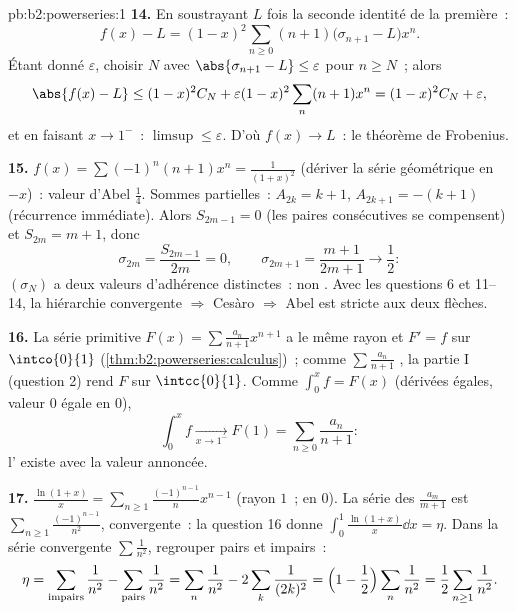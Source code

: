 \begin{solution}{pb:b2:powerseries:1}
\textbf{14.} En soustrayant $L$ fois la seconde identité de la
première~:
\[
f(x) - L = (1-x)^2\sum_{n\geq0}(n+1)
\bigl(\sigma_{n+1} - L\bigr)x^n .
\]
Étant donné $\varepsilon$, choisir $N$ avec $\abs{\sigma_{n+1} - L}
\leq \varepsilon$ pour $n \geq N$~; alors
\[
\abs{f(x) - L} \leq (1-x)^2 C_N +
\varepsilon(1-x)^2\sum_{n}(n+1)x^n
= (1-x)^2C_N + \varepsilon ,
\]
et en faisant $x \to 1^-$~: $\limsup \leq \varepsilon$. D'où
$f(x) \to L$~: le théorème de Frobenius.

\textbf{15.} $f(x) = \sum(-1)^n(n+1)x^n = \frac{1}{(1+x)^2}$
(dériver la série géométrique en $-x$)~: valeur d'Abel
$\frac14$. Sommes partielles~: $A_{2k} = k+1$, $A_{2k+1} = -(k+1)$
(récurrence immédiate). Alors $S_{2m-1} = 0$ (les paires
consécutives se compensent) et $S_{2m} = m + 1$, donc
\[
\sigma_{2m} = \frac{S_{2m-1}}{2m} = 0,
\qquad
\sigma_{2m+1} = \frac{m+1}{2m+1} \to \frac12 :
\]
$(\sigma_N)$ a deux valeurs d'adhérence distinctes~: non
. Avec les questions 6 et 11--14, la hiérarchie
convergente $\Rightarrow$ Cesàro $\Rightarrow$ Abel est stricte
aux deux flèches.

\textbf{16.} La série primitive $F(x) =
\sum\frac{a_n}{n+1}x^{n+1}$ a le même rayon et $F' = f$ sur
$\intco{0}{1}$ (\cref{thm:b2:powerseries:calculus})~; comme
$\sum\frac{a_n}{n+1}$ , la partie I (question 2) rend $F$
 sur $\intcc{0}{1}$. Comme $\int_0^x f = F(x)$ (dérivées
égales, valeur $0$ égale en $0$),
\[
\int_0^x f \xrightarrow[x\to1^-]{} F(1)
= \sum_{n\geq0}\frac{a_n}{n+1} :
\]
l' existe avec la valeur annoncée.

\textbf{17.} $\frac{\ln(1+x)}{x} =
\sum_{n\geq1}\frac{(-1)^{n-1}}{n}x^{n-1}$ (rayon $1$~;
 en $0$). La série des $\frac{a_m}{m+1}$ est
$\sum_{n\geq1}\frac{(-1)^{n-1}}{n^2}$,  convergente~:
la question 16 donne $\int_0^1\frac{\ln(1+x)}{x}\dd x = \eta$. Dans
la série  convergente $\sum\frac1{n^2}$, regrouper pairs et
impairs~:
\[
\eta = \sum_{\text{impairs}}\frac1{n^2} -
\sum_{\text{pairs}}\frac1{n^2}
= \sum_{n}\frac1{n^2} - 2\sum_{k}\frac1{(2k)^2}
= \Bigl(1 - \frac12\Bigr)\sum_n\frac1{n^2}
= \frac12\sum_{n\geq1}\frac1{n^2} .
\]


\end{solution}
